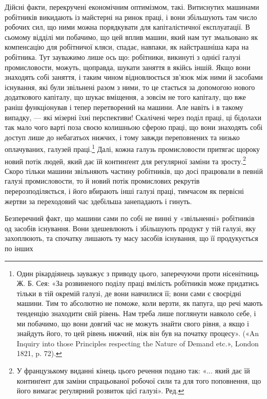Дійсні факти, перекручені економічним оптимізмом, такі.
Витиснутих машинами робітників викидають із майстерні на
ринок праці, і вони збільшують там число робочих сил, що ними
можна порядкувати для капіталістичної експлуатації. В сьомому
відділі ми побачимо, що цей вплив машин, який нам тут змальовано
як компенсацію для робітничої кляси, спадає, навпаки, як
найстрашніша кара на робітника. Тут зауважимо лише ось
що: робітники, викинуті з однієї галузі промисловости, можуть,
щоправда, шукати заняття в якійсь іншій. Якщо вони знаходять
собі заняття, і таким чином відновлюється зв’язок між ними й
засобами існування, які були звільнені разом з ними, то це
стається за допомогою нового додаткового капіталу, що шукає
вміщення, а зовсім не того капіталу, що вже раніш функціонував
і тепер перетворений на машини. Але навіть і в такому випадку,
— які мізерні їхні перспективи! Скалічені через поділ праці,
ці бідолахи так мало чого варті поза своєю колишньою сферою
праці, що вони знаходять собі доступ лише до небагатьох нижчих,
і тому завжди переповнених та низько оплачуваних, галузей
праці.\footnote{
Один рікардіянець зауважує з приводу цього, заперечуючи проти
нісенітниць Ж. Б. Сея: «За розвиненого поділу праці вмілість робітників
може придатись тільки в тій окремій галузі, де вони навчилися її; вони
сами є своєрідні машини. Тим то абсолютно не поможе, коли верзти, як
папуга, що речі мають тенденцію знаходити свій рівень. Нам треба лише
поглянути навколо себе, і ми побачимо, що вони довгий час не можуть
знайти свого рівня, а якщо і знайдуть його, то цей рівень нижчий, ніж
він був на початку процесу». («An Inquiry into those Principles respecting
the Nature of Demand etc.», London 1821, p. 72).
} Далі, кожна галузь промисловости притягає щороку
новий потік людей, який дає їй континґент для регулярної заміни
та зросту.\footnote*{
У французькому виданні кінець цього речення подано так: «... який
дає їй континґент для заміни спрацьованої робочої сили та для того поповнення,
що його вимагає реґулярний розвиток цієї галузі». Ред.
} Скоро тільки машини звільняють частину робітників,
що досі працювали в певній галузі промисловости, то й новий
потік промислових рекрутів перерозподіляється, і його вбирають
інші галузі праці, тимчасом як первісні жертви за переходовий
час здебільша занепадають і гинуть.

Безперечний факт, що машини сами по собі не винні у «звільненні»
робітників од засобів існування. Вони здешевлюють і
збільшують продукт у тій галузі, яку захоплюють, та спочатку
лишають ту масу засобів існування, що її продукується по інших
\parbreak{}  %
